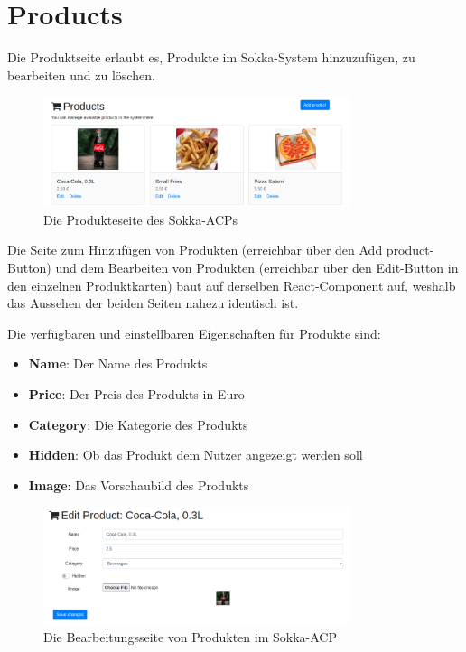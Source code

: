\section{Products}

Die Produktseite erlaubt es, Produkte im Sokka-System hinzuzufügen, zu bearbeiten und zu löschen.

\begin{figure}[ht]
    \centering
    \includegraphics[width=0.8\textwidth]{images/ACP/products.png}
    \caption{Die Produkteseite des Sokka-ACPs}
\end{figure}

Die Seite zum Hinzufügen von Produkten (erreichbar über den \glqq Add product\grqq -Button) und dem Bearbeiten von Produkten (erreichbar über den \glqq Edit\grqq -Button in den einzelnen Produktkarten) baut auf derselben React-Component auf, weshalb das Aussehen der beiden Seiten nahezu identisch ist.

Die verfügbaren und einstellbaren Eigenschaften für Produkte sind:

\begin{itemize}
    \item \textbf{Name}: Der Name des Produkts
    \item \textbf{Price}: Der Preis des Produkts in Euro
    \item \textbf{Category}: Die Kategorie des Produkts
    \item \textbf{Hidden}: Ob das Produkt dem Nutzer angezeigt werden soll
    \item \textbf{Image}: Das Vorschaubild des Produkts
\end{itemize}

\begin{figure}[ht]
    \centering
    \includegraphics[width=0.8\textwidth]{images/ACP/products_edit.png}
    \caption{Die Bearbeitungsseite von Produkten im Sokka-ACP}
\end{figure}
